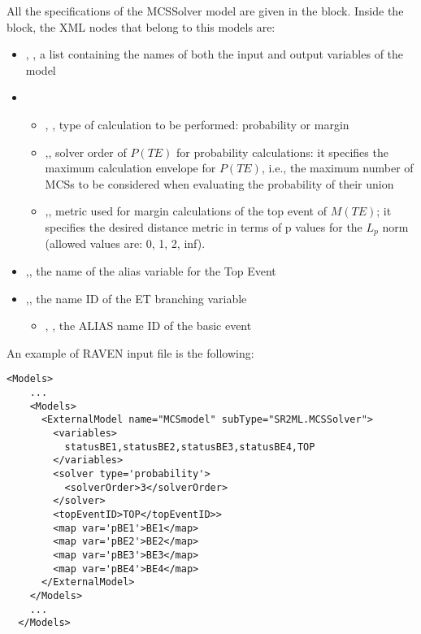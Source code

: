 All the specifications of the MCSSolver model are given in the  block. 
Inside the  block, the XML nodes that belong to this models are:
\begin{itemize}
  \item  {}, , a list containing the names of both the input and output variables of the model
  \item  {}
	  \begin{itemize}
	    \item {}, , type of calculation to be performed: probability or margin
	  
        \item {},, solver order of $P(TE)$ for probability calculations: it specifies the 
                                                                           maximum calculation envelope for $P(TE)$, i.e., the maximum number of MCSs 
                                                                           to be considered when evaluating the probability of their union
         \item {},, metric used for margin calculations of the top event of $M(TE)$; it specifies the
                                                                      desired distance metric in terms of p values for the $L_p$ norm (allowed values 
                                                                      are: 0, 1, 2, inf).
      \end{itemize}
  \item  {},, the name of the alias variable for the Top Event
  \item  {},, the name ID of the ET branching variable
	  \begin{itemize}
	    \item {}, , the ALIAS name ID of the basic event
	  \end{itemize}
\end{itemize}

An example of RAVEN input file is the following:

\begin{lstlisting}[style=XML,morekeywords={anAttribute},caption=MCSSolver model input example., label=lst:MCSSolver_InputExample]
  <Models> 
    ...
    <Models>
      <ExternalModel name="MCSmodel" subType="SR2ML.MCSSolver">
        <variables>
          statusBE1,statusBE2,statusBE3,statusBE4,TOP
        </variables>
        <solver type='probability'> 
          <solverOrder>3</solverOrder>
        </solver> 
        <topEventID>TOP</topEventID>>
        <map var='pBE1'>BE1</map>
        <map var='pBE2'>BE2</map>
        <map var='pBE3'>BE3</map>
        <map var='pBE4'>BE4</map>
      </ExternalModel>
    </Models>
    ...
  </Models>
\end{lstlisting}

